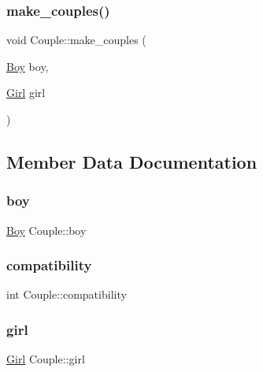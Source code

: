 \mbox{\label{class_couple_a1ea5a69da1af9ff8b7a663be1d8ae05c}} 
\subsubsection{\texorpdfstring{make\+\_\+couples()}{make\_couples()}}
{\footnotesize\ttfamily void Couple\+::make\+\_\+couples (\begin{DoxyParamCaption}\item[{\hyperlink{class_boy}{Boy}}]{boy,  }\item[{\hyperlink{class_girl}{Girl}}]{girl }\end{DoxyParamCaption})}



\subsection{Member Data Documentation}
\mbox{\label{class_couple_a2f4c4e8df15d0a648023a29d48a4dbc8}} 
\subsubsection{\texorpdfstring{boy}{boy}}
{\footnotesize\ttfamily \hyperlink{class_boy}{Boy} Couple\+::boy}

\mbox{\label{class_couple_af47d6ced781259303e10836182abb8c1}} 
\subsubsection{\texorpdfstring{compatibility}{compatibility}}
{\footnotesize\ttfamily int Couple\+::compatibility}

\mbox{\label{class_couple_a0e654a04711c8a9e1f53472c9e57cb5a}} 
\subsubsection{\texorpdfstring{girl}{girl}}
{\footnotesize\ttfamily \hyperlink{class_girl}{Girl} Couple\+::girl}

